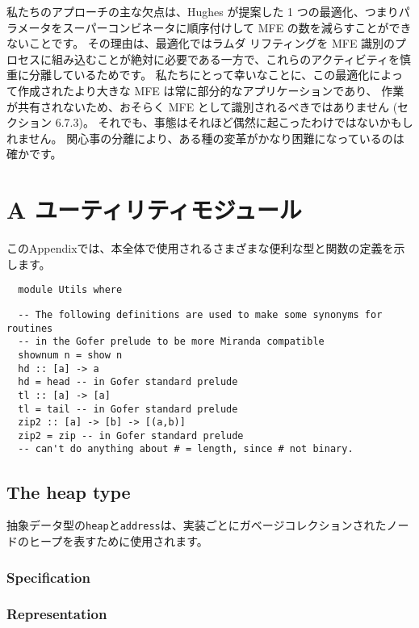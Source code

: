\documentclass{jarticle}
\begin{document}
私たちのアプローチの主な欠点は、Hughes が提案した 1 つの最適化、つまりパラメータをスーパーコンビネータに順序付けして MFE の数を減らすことができないことです。
その理由は、最適化ではラムダ リフティングを MFE 識別のプロセスに組み込むことが絶対に必要である一方で、これらのアクティビティを慎重に分離しているためです。
私たちにとって幸いなことに、この最適化によって作成されたより大きな MFE は常に部分的なアプリケーションであり、
作業が共有されないため、おそらく MFE として識別されるべきではありません (セクション 6.7.3)。
それでも、事態はそれほど偶然に起こったわけではないかもしれません。
関心事の分離により、ある種の変革がかなり困難になっているのは確かです。
\newpage

\section{A ユーティリティモジュール}

このAppendixでは、本全体で使用されるさまざまな便利な型と関数の定義を示します。

\begin{verbatim}
  module Utils where
\end{verbatim}

\begin{verbatim}
  -- The following definitions are used to make some synonyms for routines
  -- in the Gofer prelude to be more Miranda compatible
  shownum n = show n
  hd :: [a] -> a
  hd = head -- in Gofer standard prelude
  tl :: [a] -> [a]
  tl = tail -- in Gofer standard prelude
  zip2 :: [a] -> [b] -> [(a,b)]
  zip2 = zip -- in Gofer standard prelude
  -- can't do anything about # = length, since # not binary.
\end{verbatim}

\subsection{The heap type}

抽象データ型の\texttt{heap}と\texttt{address}は、実装ごとにガベージコレクションされたノードのヒープを表すために使用されます。

\subsubsection{Specification}
\subsubsection{Representation}
\newpage
\end{document}

